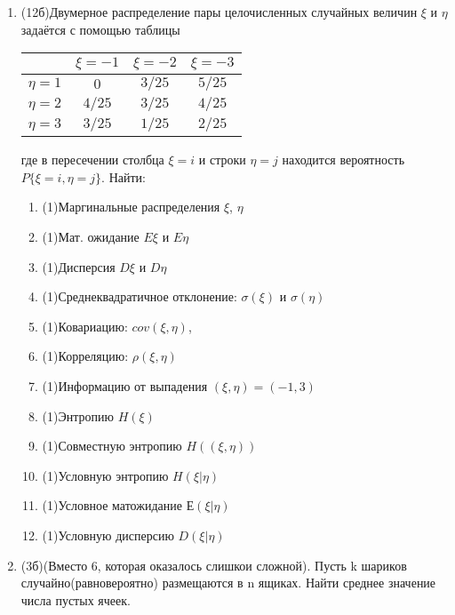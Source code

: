 \documentclass[a4paper, 14pt]{extarticle}
\begin{document}
\begin{enumerate}
\newpage
 \item 
(12б)Двумерное распределение пары целочисленных случайных величин $\xi$ и $\eta$ задаётся с помощью таблицы

\begin{center}
\begin{tabular}{|c|c|c|c|}
\hline
 & $\xi = -1$ & $\xi = -2$ & $\xi = -3$\\
\hline
$\eta = 1$ & $ 0 $ & $3/25$ & $5/25$\\ 
\hline
$\eta = 2$ & $4/25$ & $3/25$ & $4/25$\\ 
\hline
$\eta = 3$ & $3/25$ & $1/25$ & $2/25$\\ 

\hline
\end{tabular}

\end{center}
где в пересечении столбца $\xi = i$ и строки $\eta = j$ находится вероятность $P\lbrace{\xi = i, \eta = j\rbrace}$. Найти:

\begin{enumerate}
    \item (1)Маргинальные распределения $\xi$, $\eta$
    \item (1)Мат. ожидание $E\xi$ и $E\eta$
    \item (1)Дисперсия $D\xi$ и $D\eta$
    \item (1)Среднеквадратичное отклонение: $\sigma(\xi)$ и $\sigma(\eta)$ 
    \item (1)Ковариацию: $cov(\xi, \eta) $,
    \item (1)Корреляцию: $\rho(\xi, \eta)$
    \item (1)Информацию от выпадения $(\xi,\eta)=(-1,3)$
    \item (1)Энтропию $H(\xi)$
    \item (1)Совместную энтропию $H((\xi, \eta))$
    \item (1)Условную энтропию $H(\xi|\eta)$
    \item (1)Условное матожидание $Е(\xi|\eta)$
    \item (1)Условную дисперсию $D(\xi|\eta)$
\end{enumerate}

\item(3б)(Вместо 6, которая оказалось слишкои сложной). 
Пусть k шариков случайно(равновероятно) размещаются в n
ящиках. Найти среднее значение числа пустых ячеек.    


\end{enumerate}
\end{document}
